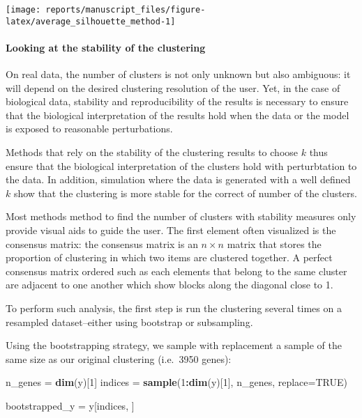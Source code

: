\documentclass[9pt,a4paper,]{extarticle}
\newenvironment{Shaded}{\begin{snugshade}}{\end{snugshade}}
\newcommand{\DataTypeTok}[1]{\textcolor[rgb]{0.13,0.29,0.53}{#1}}
\newcommand{\DecValTok}[1]{\textcolor[rgb]{0.00,0.00,0.81}{#1}}
\newcommand{\KeywordTok}[1]{\textcolor[rgb]{0.13,0.29,0.53}{\textbf{#1}}}
\newcommand{\NormalTok}[1]{#1}
\newcommand{\OperatorTok}[1]{\textcolor[rgb]{0.81,0.36,0.00}{\textbf{#1}}}
\newcommand{\OtherTok}[1]{\textcolor[rgb]{0.56,0.35,0.01}{#1}}
\newcommand{\StringTok}[1]{\textcolor[rgb]{0.31,0.60,0.02}{#1}}
\begin{document}
\begin{center}\texttt{[image: reports/manuscript\_files/figure-latex/average\_silhouette\_method-1]} \end{center}

\hypertarget{looking-at-the-stability-of-the-clustering}{%
\paragraph{Looking at the stability of the clustering}\label{looking-at-the-stability-of-the-clustering}}

On real data, the number of clusters is not only unknown but also
ambiguous: it will depend on the desired clustering resolution of the user.
Yet, in the case of biological data, stability and reproducibility of the
results is necessary to ensure that the biological interpretation of the
results hold when the data or the model is exposed to reasonable
perturbations.

Methods that rely on the stability of the clustering results to choose \(k\)
thus ensure that the biological interpretation of the clusters hold with
perturbtation to the data. In addition, simulation where the data is generated
with a well defined \(k\) show that the clustering is more stable for the
correct of number of the clusters.

Most methods method to find the number of clusters with stability measures
only provide visual aids to guide the user. The first element often visualized
is the consensus matrix: the consensus matrix is an \(n \times n\) matrix that
stores the proportion of clustering in which two items are clustered together.
A perfect consensus matrix ordered such as each elements that belong to the
same cluster are adjacent to one another which show blocks along the diagonal
close to 1.

To perform such analysis, the first step is run the clustering several times
on a resampled dataset--either using bootstrap or subsampling.

Using the bootstrapping strategy, we sample with replacement a sample of the
same size as our original clustering (i.e.~3950 genes):

\begin{Shaded}
\begin{Highlighting}[]
\NormalTok{n_genes =}\StringTok{ }\KeywordTok{dim}\NormalTok{(y)[}\DecValTok{1}\NormalTok{]}
\NormalTok{indices =}\StringTok{ }\KeywordTok{sample}\NormalTok{(}\DecValTok{1}\OperatorTok{:}\KeywordTok{dim}\NormalTok{(y)[}\DecValTok{1}\NormalTok{], n_genes, }\DataTypeTok{replace=}\OtherTok{TRUE}\NormalTok{)}

\NormalTok{bootstrapped_y =}\StringTok{ }\NormalTok{y[indices, ]}
\end{Highlighting}
\end{Shaded}
\end{document}
